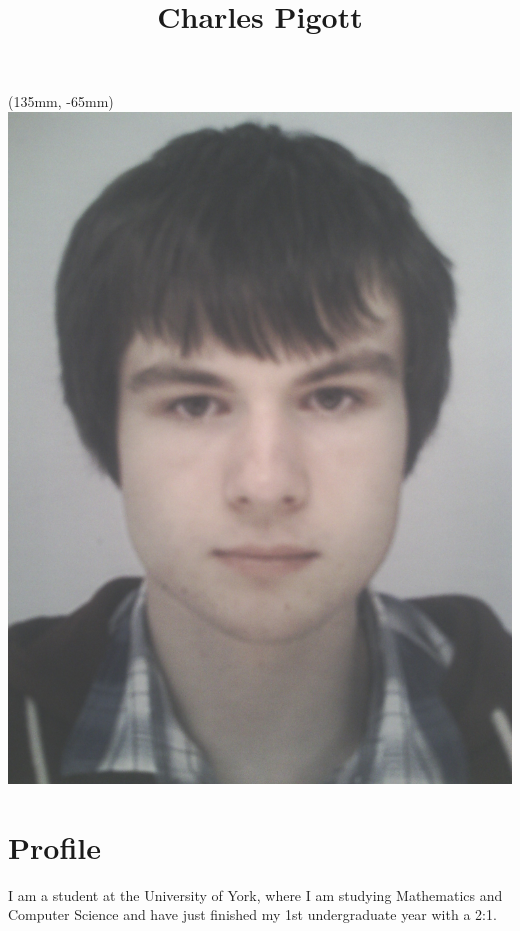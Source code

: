 \documentclass[11pt,a4paper]{article}
\title{Charles Pigott}
\author{}
\date{
  \email{\selfemail}\\
  07821 169 013 (Mobile)\\
  \address
}
\begin{document}
\maketitle
\ifuni
  \begin{textblock*}{40mm}(135mm, -65mm)
  \includegraphics[scale=0.045]{FaceOct13}
  \end{textblock*}
\fi
\thispagestyle{fancy}

\section*{Profile}
I am a student at the University of York, where I am studying Mathematics and
Computer Science and have just finished my 1st undergraduate year with a 2:1.
\end{document}
